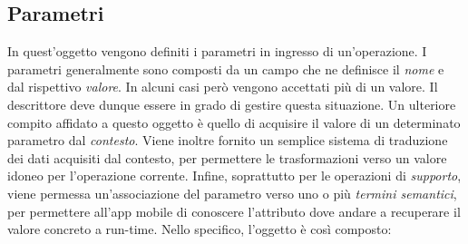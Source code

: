 \subsection{Parametri\label{sec:descrittore-parametri}}

In quest'oggetto vengono definiti i parametri in ingresso di un'operazione. I parametri generalmente sono composti da un campo che ne definisce il \emph{nome} e dal rispettivo \emph{valore}. In alcuni casi però vengono accettati più di un valore. Il descrittore deve dunque essere in grado di gestire questa situazione. Un ulteriore compito affidato a questo oggetto è quello di acquisire il valore di un determinato parametro dal \emph{contesto}. Viene inoltre fornito un semplice sistema di traduzione dei dati acquisiti dal contesto, per permettere le trasformazioni verso un valore idoneo per l'operazione corrente. Infine, soprattutto per le operazioni di \emph{supporto}, viene permessa un'associazione del parametro verso uno o più \emph{termini semantici}, per permettere all'app mobile di conoscere l'attributo dove andare a recuperare il valore concreto a run-time. Nello specifico, l'oggetto è così composto:

